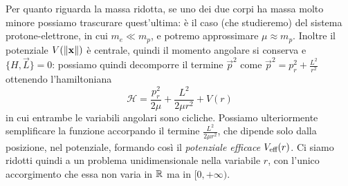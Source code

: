 Per quanto riguarda la massa ridotta, se uno dei due corpi ha massa molto minore possiamo trascurare quest'ultima: è il caso (che studieremo) del sistema protone-elettrone, in cui $m_e\ll m_p$, e potremo approssimare $\mu\approx m_p$.
Inoltre il potenziale $V(\left\|{\mathbf{x}}\right\|)$ è centrale, quindi il momento angolare si conserva e $\{H,\vec L\}=0$: possiamo quindi decomporre il termine $\vec p^2$ come $\vec p^2=p_r^2+\frac{L^2}{r^2}$ ottenendo l'hamiltoniana
\begin{equation}
	\mathcal H=\frac{p_r^2}{2\mu}+\frac{L^2}{2\mu r^2}+V(r)
	\label{eq:hamiltoniana-radiale}
\end{equation}
in cui entrambe le variabili angolari sono cicliche.
Possiamo ulteriormente semplificare la funzione accorpando il termine $\frac{L^2}{2\mu r^2}$, che dipende solo dalla posizione, nel potenziale, formando cos\`i il \emph{potenziale efficace} $V_\textup{eff}(r)$.
Ci siamo ridotti quindi a un problema unidimensionale nella variabile $r$, con l'unico accorgimento che essa non varia in $\mathbb{R}$ ma in $[0,+\infty)$.

